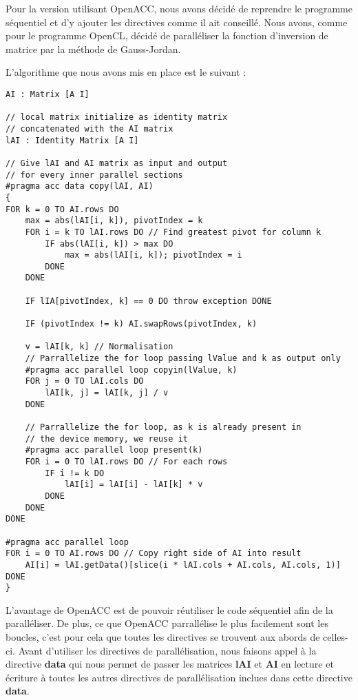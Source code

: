 \documentclass[a4paper, french]{article}
\begin{document}
Pour la version utilisant OpenACC, nous avons décidé de reprendre le programme séquentiel et d'y ajouter les directives comme il ait conseillé. Nous avons, comme pour le programme OpenCL, décidé de paralléliser la fonction d'inversion de matrice par la méthode de Gauss-Jordan. 

L'algorithme que nous avons mis en place est le suivant : 

\begin{lstlisting}[style=txt]
AI : Matrix [A I]

// local matrix initialize as identity matrix 
// concatenated with the AI matrix
lAI : Identity Matrix [A I] 

// Give lAI and AI matrix as input and output 
// for every inner parallel sections
#pragma acc data copy(lAI, AI)
{
FOR k = 0 TO AI.rows DO
    max = abs(lAI[i, k]), pivotIndex = k
    FOR i = k TO lAI.rows DO // Find greatest pivot for column k
        IF abs(lAI[i, k]) > max DO
            max = abs(lAI[i, k]); pivotIndex = i
        DONE
    DONE

    IF lIA[pivotIndex, k] == 0 DO throw exception DONE

    IF (pivotIndex != k) AI.swapRows(pivotIndex, k)

    v = lAI[k, k] // Normalisation
    // Parrallelize the for loop passing lValue and k as output only
    #pragma acc parallel loop copyin(lValue, k)
    FOR j = 0 TO lAI.cols DO
        lAI[k, j] = lAI[k, j] / v
    DONE

    // Parrallelize the for loop, as k is already present in 
    // the device memory, we reuse it
    #pragma acc parallel loop present(k)
    FOR i = 0 TO lAI.rows DO // For each rows
        IF i != k DO
            lAI[i] = lAI[i] - lAI[k] * v
        DONE
    DONE
DONE

#pragma acc parallel loop
FOR i = 0 TO AI.rows DO // Copy right side of AI into result
    AI[i] = lAI.getData()[slice(i * lAI.cols + AI.cols, AI.cols, 1)]
DONE
}
\end{lstlisting}

L'avantage de OpenACC est de pouvoir réutiliser le code séquentiel afin de la paralléliser. De plus, ce que OpenACC parrallélise le plus facilement sont les boucles, c'est pour cela que toutes les directives se trouvent aux abords de celles-ci. Avant d'utiliser les directives de parallélisation, nous faisons appel à la directive \textbf{data} qui nous permet de passer les matrices \textbf{lAI} et \textbf{AI} en lecture et écriture à toutes les autres directives de parallélisation inclues dans cette directive \textbf{data}.
\end{document}
